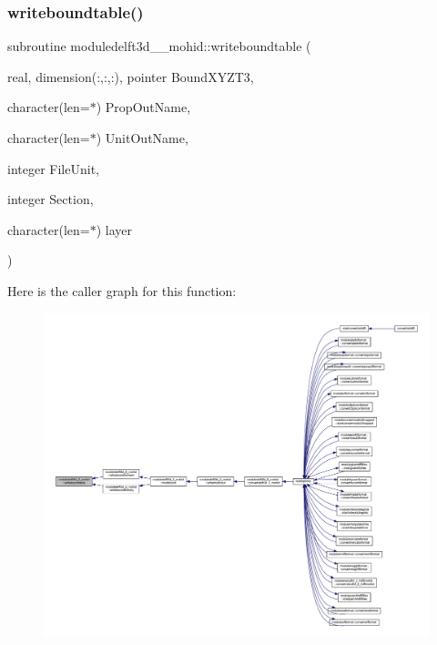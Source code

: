 \subsubsection{\texorpdfstring{writeboundtable()}{writeboundtable()}}
{\footnotesize\ttfamily subroutine moduledelft3d\+\_\+\_\+mohid\+::writeboundtable (\begin{DoxyParamCaption}\item[{real, dimension(\+:,\+:,\+:), pointer}]{Bound\+X\+Y\+Z\+T3,  }\item[{character(len=$\ast$)}]{Prop\+Out\+Name,  }\item[{character(len=$\ast$)}]{Unit\+Out\+Name,  }\item[{integer}]{File\+Unit,  }\item[{integer}]{Section,  }\item[{character(len=$\ast$)}]{layer }\end{DoxyParamCaption})\hspace{0.3cm}{\ttfamily [private]}}

Here is the caller graph for this function\+:\nopagebreak
\begin{figure}[H]
\begin{center}
\leavevmode
\includegraphics[width=350pt]{namespacemoduledelft3d__2__mohid_a8b7bcfa950bb28feff319224f0ee581e_icgraph}
\end{center}
\end{figure}
\mbox{\label{namespacemoduledelft3d__2__mohid_a80eedb762138913565ab5df14043c948}} 

